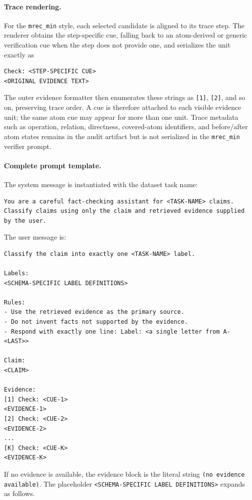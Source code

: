 \paragraph{Trace rendering.}
For the \texttt{mrec\_min} style, each selected candidate is aligned to
its trace step.  The renderer obtains the step-specific cue, falling back
to an atom-derived or generic verification cue when the step does not
provide one, and serializes the unit exactly as
\begin{lstlisting}
Check: <STEP-SPECIFIC CUE>
<ORIGINAL EVIDENCE TEXT>
\end{lstlisting}
The outer evidence formatter then enumerates these strings as
\texttt{[1]}, \texttt{[2]}, and so on, preserving trace order.  A cue is
therefore attached to each visible evidence unit; the same atom cue may
appear for more than one unit.  Trace metadata such as operation,
relation, directness, covered-atom identifiers, and before/after atom
states remains in the audit artifact but is not serialized in the
\texttt{mrec\_min} verifier prompt.

\paragraph{Complete prompt template.}
The system message is instantiated with the dataset task name:
\begin{lstlisting}
You are a careful fact-checking assistant for <TASK-NAME> claims. Classify claims using only the claim and retrieved evidence supplied by the user.
\end{lstlisting}
The user message is:
\begin{lstlisting}
Classify the claim into exactly one <TASK-NAME> label.

Labels:
<SCHEMA-SPECIFIC LABEL DEFINITIONS>

Rules:
- Use the retrieved evidence as the primary source.
- Do not invent facts not supported by the evidence.
- Respond with exactly one line: Label: <a single letter from A-<LAST>>

Claim:
<CLAIM>

Evidence:
[1] Check: <CUE-1>
<EVIDENCE-1>
[2] Check: <CUE-2>
<EVIDENCE-2>
...
[K] Check: <CUE-K>
<EVIDENCE-K>
\end{lstlisting}
If no evidence is available, the evidence block is the literal string
\texttt{(no evidence available)}.  The placeholder
\texttt{<SCHEMA-SPECIFIC LABEL DEFINITIONS>} expands as follows.

